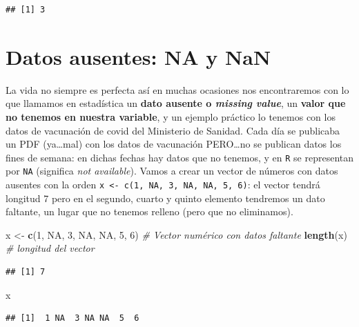 \documentclass[11pt,]{book}
\newenvironment{Shaded}{\begin{snugshade}}{\end{snugshade}}
\newcommand{\CommentTok}[1]{\textcolor[rgb]{0.37,0.37,0.37}{\textit{#1}}}
\newcommand{\DecValTok}[1]{\textcolor[rgb]{0.06,0.06,0.06}{#1}}
\newcommand{\KeywordTok}[1]{\textcolor[rgb]{0.27,0.27,0.27}{\textbf{#1}}}
\newcommand{\NormalTok}[1]{#1}
\newcommand{\OtherTok}[1]{\textcolor[rgb]{0.37,0.37,0.37}{#1}}
\newcommand{\StringTok}[1]{\textcolor[rgb]{0.5,0.5,0.5}{#1}}
\begin{document}
\begin{verbatim}
## [1] 3
\end{verbatim}

\hypertarget{datos-ausentes-na-y-nan}{%
\section{Datos ausentes: NA y NaN}\label{datos-ausentes-na-y-nan}}

La vida no siempre es perfecta así en muchas ocasiones nos encontraremos con lo que llamamos en estadística un \textbf{dato ausente o \emph{missing value}}, un \textbf{valor que no tenemos en nuestra variable}, y un ejemplo práctico lo tenemos con los datos de vacunación de covid del Ministerio de Sanidad. Cada día se publicaba un PDF (ya\ldots{}mal) con los datos de vacunación PERO\ldots{}no se publican datos los fines de semana: en dichas fechas hay datos que no tenemos, y en \texttt{R} se representan por \texttt{NA} (significa \emph{not available}). Vamos a crear un vector de números con datos ausentes con la orden \texttt{x\ \textless{}-\ c(1,\ NA,\ 3,\ NA,\ NA,\ 5,\ 6)}: el vector tendrá longitud 7 pero en el segundo, cuarto y quinto elemento tendremos un dato faltante, un lugar que no tenemos relleno (pero que no eliminamos).

\begin{Shaded}
\begin{Highlighting}[]
\NormalTok{x <-}\StringTok{ }\KeywordTok{c}\NormalTok{(}\DecValTok{1}\NormalTok{, }\OtherTok{NA}\NormalTok{, }\DecValTok{3}\NormalTok{, }\OtherTok{NA}\NormalTok{, }\OtherTok{NA}\NormalTok{, }\DecValTok{5}\NormalTok{, }\DecValTok{6}\NormalTok{) }\CommentTok{# Vector numérico con datos faltante}
\KeywordTok{length}\NormalTok{(x) }\CommentTok{# longitud del vector}
\end{Highlighting}
\end{Shaded}

\begin{verbatim}
## [1] 7
\end{verbatim}

\begin{Shaded}
\begin{Highlighting}[]
\NormalTok{x}
\end{Highlighting}
\end{Shaded}

\begin{verbatim}
## [1]  1 NA  3 NA NA  5  6
\end{verbatim}
\end{document}
